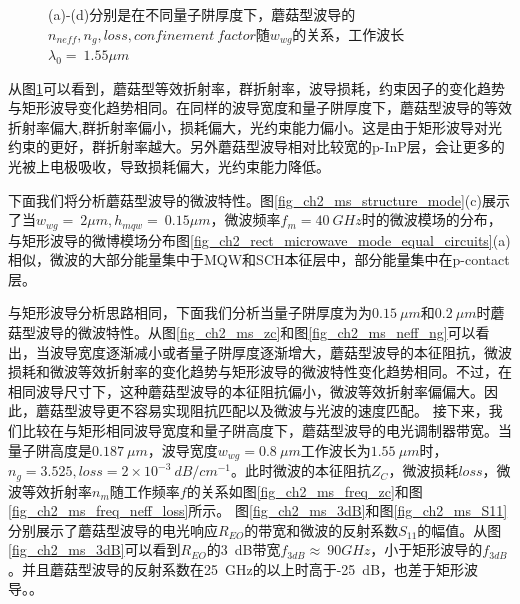 \begin{figure}[htb]
{\begin{minipage}[]{0.5\textwidth}
		\end{minipage}}
\caption{(a)-(d)分别是在不同量子阱厚度下，蘑菇型波导的$n_{neff}, n_g, loss, confinement~factor$随$w_{wg}$的关系，工作波长$\lambda_0 = ~1.55\mu m$}
\label{fig_ch2_ms_property}
\end{figure}


从图\ref{fig_ch2_ms_property}可以看到，蘑菇型等效折射率，群折射率，波导损耗，约束因子的变化趋势与矩形波导变化趋势相同。在同样的波导宽度和量子阱厚度下，蘑菇型波导的等效折射率偏大,群折射率偏小，损耗偏大，光约束能力偏小。这是由于矩形波导对光约束的更好，群折射率越大。另外蘑菇型波导相对比较宽的p-InP层，会让更多的光被上电极吸收，导致损耗偏大，光约束能力降低。

下面我们将分析蘑菇型波导的微波特性。图\ref{fig_ch2_ms_structure_mode}(c)展示了当$w_{wg} =~2 \mu m, h_{mqw} =~ 0.15 \mu m$，微波频率$f_m =40~ GHz$时的微波模场的分布，与矩形波导的微博模场分布图\ref{fig_ch2_rect_microwave_mode_equal_circuits}(a)相似，微波的大部分能量集中于MQW和SCH本征层中，部分能量集中在p-contact层。

与矩形波导分析思路相同，下面我们分析当量子阱厚度为为$0.15~ \mu m$和$0.2 ~\mu m$时蘑菇型波导的微波特性。从图\ref{fig_ch2_ms_zc}和图\ref{fig_ch2_ms_neff_ng}可以看出，当波导宽度逐渐减小或者量子阱厚度逐渐增大，蘑菇型波导的本征阻抗，微波损耗和微波等效折射率的变化趋势与矩形波导的微波特性变化趋势相同。不过，在相同波导尺寸下，这种蘑菇型波导的本征阻抗偏小，微波等效折射率偏偏大。因此，蘑菇型波导更不容易实现阻抗匹配以及微波与光波的速度匹配。
接下来，我们比较在与矩形相同波导宽度和量子阱高度下，蘑菇型波导的电光调制器带宽。当量子阱高度是$0.187~ \mu m$，波导宽度$w_{wg} = 0.8~ \mu m$工作波长为$1.55~ \mu m$时，$n_g = 3.525, loss =  2\times 10^{-3} ~dB/cm^{-1} $。此时微波的本征阻抗$Z_C$，微波损耗$loss$，微波等效折射率$n_m$随工作频率$f$的关系如图\ref{fig_ch2_ms_freq_zc}和图\ref{fig_ch2_ms_freq_neff_loss}所示。
图\ref{fig_ch2_ms_3dB}和图\ref{fig_ch2_ms_S11}分别展示了蘑菇型波导的电光响应$R_{EO}$的带宽和微波的反射系数$S_{11}$的幅值。从图\ref{fig_ch2_ms_3dB}可以看到$R_{EO}$的3~dB带宽$f_{3dB}\approx ~90 GHz$，小于矩形波导的$f_{3dB}$。并且蘑菇型波导的反射系数在25~GHz的以上时高于-25~dB，也差于矩形波导。\cite{tang2012over}。

